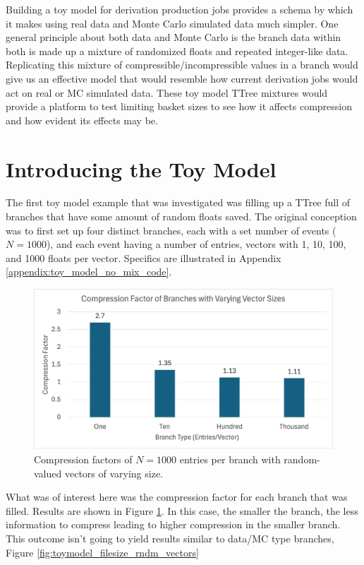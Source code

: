 Building a toy model for derivation production jobs provides a schema by which it makes using real data and Monte Carlo simulated data much simpler.
One general principle about both data and Monte Carlo is the branch data within both is made up a mixture of randomized floats and repeated integer-like data.
Replicating this mixture of compressible/incompressible values in a branch would give us an effective model that would resemble how current derivation jobs would act on real or MC simulated data. 
These toy model TTree mixtures would provide a platform to test limiting basket sizes to see how it affects compression and how evident its effects may be. 

\section{Introducing the Toy Model}

The first toy model example that was investigated was filling up a TTree full of branches that have some amount of random floats saved.
The original conception was to first set up four distinct branches, each with a set number of events ($N=1000$), and each event having a number of entries, vectors with 1, 10, 100, and 1000 floats per vector.
Specifics are illustrated in Appendix \ref{appendix:toy_model_no_mix_code}.

\begin{figure}[h]\label{fig:toymodel_compF_rndm_vectors}
    \caption{Compression factors of $N=1000$ entries per branch with random-valued vectors of varying size.}
    \centering
    \includegraphics[width=.8\textwidth]{content/toymodel_content/branch_compfacts_nomix.png}
\end{figure}

What was of interest here was the compression factor for each branch that was filled. Results are shown in Figure \ref{fig:toymodel_compF_rndm_vectors}.
In this case, the smaller the branch, the less information to compress leading to higher compression in the smaller branch.
This outcome isn't going to yield results similar to data/MC type branches, Figure \ref{fig:toymodel_filesize_rndm_vectors}

